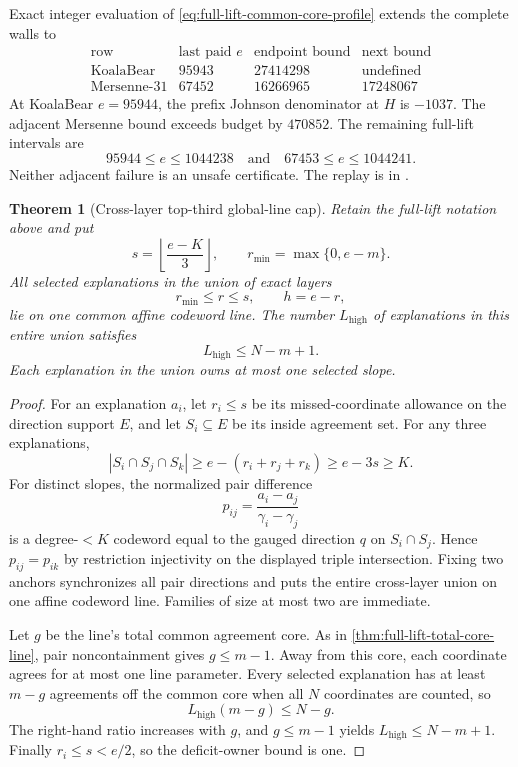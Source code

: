 \documentclass[11pt,a4paper]{amsart}
\numberwithin{equation}{section}
\newtheorem{theorem}{Theorem}[section]
\theoremstyle{remark}
\begin{document}
\begin{remark}
Exact integer evaluation of
\eqref{eq:full-lift-common-core-profile} extends the complete walls to
\[
\begin{array}{c|r|r|r}
\text{row}&\text{last paid }e&\text{endpoint bound}&\text{next bound}\\ \hline
\text{KoalaBear}&95943&27414298&\text{undefined}\\
\text{Mersenne-31}&67452&16266965&17248067
\end{array}
\]
At KoalaBear \(e=95944\), the prefix Johnson denominator at \(H\) is
\(-1037\).  The adjacent Mersenne bound exceeds budget by \(470852\).
The remaining full-lift intervals are
\[
 95944\le e\le1044238
 \quad\text{and}\quad
 67453\le e\le1044241.
\]
Neither adjacent failure is an unsafe certificate.  The replay is in
.
\end{remark}

\begin{theorem}[Cross-layer top-third global-line cap]
\label{thm:full-lift-top-third-global-line}
Retain the full-lift notation above and put
\[
 s=\left\lfloor\frac{e-K}{3}\right\rfloor,
 \qquad r_{\min}=\max\{0,e-m\}.
\]
All selected explanations in the union of exact layers
\[
 r_{\min}\le r\le s,
 \qquad h=e-r,
\]
lie on one common affine codeword line.  The number $L_{\mathrm{high}}$
of explanations in this entire union satisfies
\begin{equation}
 L_{\mathrm{high}}\le N-m+1.
 \label{eq:full-lift-top-third-global-line}
\end{equation}
Each explanation in the union owns at most one selected slope.
\end{theorem}

\begin{proof}
For an explanation $a_i$, let $r_i\le s$ be its missed-coordinate
allowance on the direction support $E$, and let $S_i\subseteq E$ be
its inside agreement set.  For any three explanations,
\[
 |S_i\cap S_j\cap S_k|
 \ge e-(r_i+r_j+r_k)
 \ge e-3s
 \ge K.
\]
For distinct slopes, the normalized pair difference
\[
 p_{ij}=\frac{a_i-a_j}{\gamma_i-\gamma_j}
\]
is a degree-$<K$ codeword equal to the gauged direction $q$ on
$S_i\cap S_j$.  Hence $p_{ij}=p_{ik}$ by restriction injectivity on
the displayed triple intersection.  Fixing two anchors synchronizes all
pair directions and puts the entire cross-layer union on one affine
codeword line.  Families of size at most two are immediate.

Let $g$ be the line's total common agreement core.  As in
\cref{thm:full-lift-total-core-line}, pair noncontainment gives
$g\le m-1$.  Away from this core, each coordinate agrees for at most one
line parameter.  Every selected explanation has at least $m-g$
agreements off the common core when all $N$ coordinates are counted, so
\[
 L_{\mathrm{high}}(m-g)\le N-g.
\]
The right-hand ratio increases with $g$, and $g\le m-1$ yields
$L_{\mathrm{high}}\le N-m+1$.  Finally $r_i\le s<e/2$, so the
deficit-owner bound is one.
\end{proof}
\end{document}
